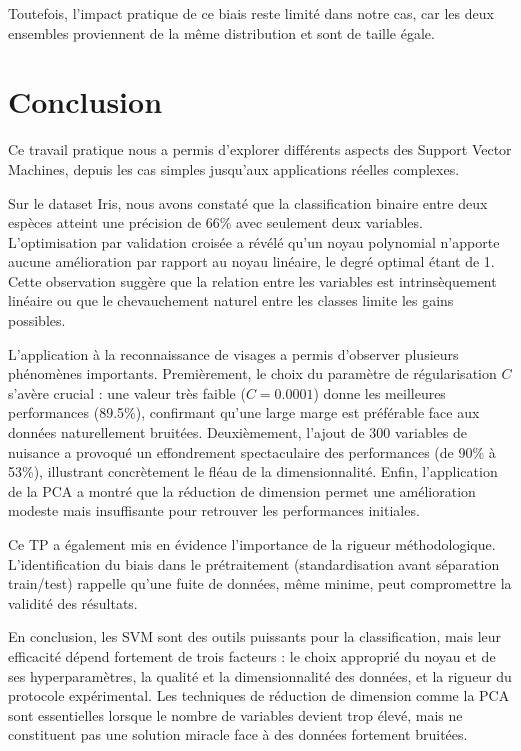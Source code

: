 \documentclass[11pt,a4paper]{article}
\begin{document}
Toutefois, l'impact pratique de ce biais reste limité dans notre cas, car les deux ensembles proviennent de la même distribution et sont de taille égale.


\section{Conclusion}

Ce travail pratique nous a permis d'explorer différents aspects des Support Vector Machines, depuis les cas simples jusqu'aux applications réelles complexes.

Sur le dataset Iris, nous avons constaté que la classification binaire entre deux espèces atteint une précision de 66\% avec seulement deux variables. L'optimisation par validation croisée a révélé qu'un noyau polynomial n'apporte aucune amélioration par rapport au noyau linéaire, le degré optimal étant de 1. Cette observation suggère que la relation entre les variables est intrinsèquement linéaire ou que le chevauchement naturel entre les classes limite les gains possibles.

L'application à la reconnaissance de visages a permis d'observer plusieurs phénomènes importants. Premièrement, le choix du paramètre de régularisation $C$ s'avère crucial : une valeur très faible ($C = 0.0001$) donne les meilleures performances (89.5\%), confirmant qu'une large marge est préférable face aux données naturellement bruitées. Deuxièmement, l'ajout de 300 variables de nuisance a provoqué un effondrement spectaculaire des performances (de 90\% à 53\%), illustrant concrètement le fléau de la dimensionnalité. Enfin, l'application de la PCA a montré que la réduction de dimension permet une amélioration modeste mais insuffisante pour retrouver les performances initiales.

Ce TP a également mis en évidence l'importance de la rigueur méthodologique. L'identification du biais dans le prétraitement (standardisation avant séparation train/test) rappelle qu'une fuite de données, même minime, peut compromettre la validité des résultats.

En conclusion, les SVM sont des outils puissants pour la classification, mais leur efficacité dépend fortement de trois facteurs : le choix approprié du noyau et de ses hyperparamètres, la qualité et la dimensionnalité des données, et la rigueur du protocole expérimental. Les techniques de réduction de dimension comme la PCA sont essentielles lorsque le nombre de variables devient trop élevé, mais ne constituent pas une solution miracle face à des données fortement bruitées.
\end{document}
